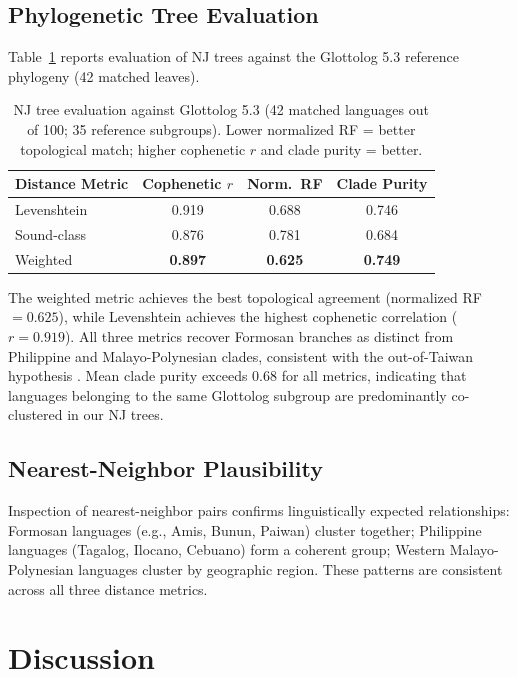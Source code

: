 \documentclass[manuscript]{clv2025}
\begin{document}
\subsection{Phylogenetic Tree Evaluation}

Table~\ref{tab:tree} reports evaluation of NJ trees against the Glottolog 5.3 reference phylogeny (42 matched leaves).

\begin{table}[t]
\centering
\caption{NJ tree evaluation against Glottolog 5.3 (42 matched languages out of 100; 35 reference subgroups). Lower normalized RF = better topological match; higher cophenetic $r$ and clade purity = better.}
\label{tab:tree}
\begin{tabular}{lccc}
\toprule
\textbf{Distance Metric} & \textbf{Cophenetic $r$} & \textbf{Norm.\ RF} & \textbf{Clade Purity} \\
\midrule
Levenshtein  & 0.919 & 0.688 & 0.746 \\
Sound-class  & 0.876 & 0.781 & 0.684 \\
Weighted     & \textbf{0.897} & \textbf{0.625} & \textbf{0.749} \\
\bottomrule
\end{tabular}
\end{table}

The weighted metric achieves the best topological agreement (normalized RF $= 0.625$), while Levenshtein achieves the highest cophenetic correlation ($r = 0.919$). All three metrics recover Formosan branches as distinct from Philippine and Malayo-Polynesian clades, consistent with the out-of-Taiwan hypothesis \cite{gray2009pnas}. Mean clade purity exceeds 0.68 for all metrics, indicating that languages belonging to the same Glottolog subgroup are predominantly co-clustered in our NJ trees.

\subsection{Nearest-Neighbor Plausibility}

Inspection of nearest-neighbor pairs confirms linguistically expected relationships: Formosan languages (e.g., Amis, Bunun, Paiwan) cluster together; Philippine languages (Tagalog, Ilocano, Cebuano) form a coherent group; Western Malayo-Polynesian languages cluster by geographic region. These patterns are consistent across all three distance metrics.

\section{Discussion}
\label{sec:discussion}
\end{document}
